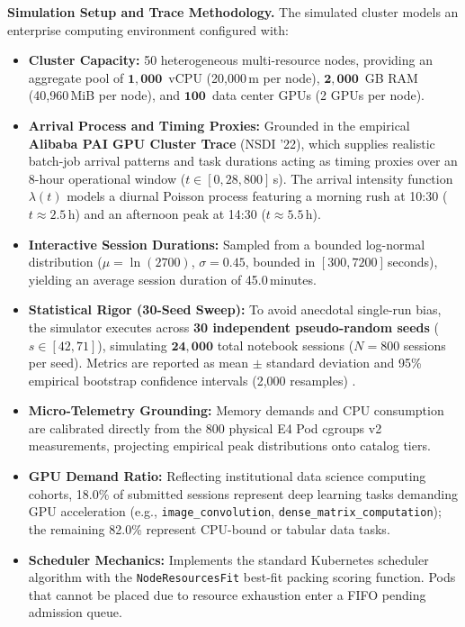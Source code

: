 \textbf{Simulation Setup and Trace Methodology.}
The simulated cluster models an enterprise computing environment configured with:
\begin{itemize}
    \item \textbf{Cluster Capacity:} 50 heterogeneous multi-resource nodes, providing an aggregate pool of $\mathbf{1,000}$~vCPU (20,000\,m per node), $\mathbf{2,000}$~GB RAM (40,960\,MiB per node), and $\mathbf{100}$~data center GPUs (2 GPUs per node).
    \item \textbf{Arrival Process and Timing Proxies:} Grounded in the empirical \textbf{Alibaba PAI GPU Cluster Trace} \cite{alibaba_gpu_trace} (NSDI '22), which supplies realistic batch-job arrival patterns and task durations acting as timing proxies over an 8-hour operational window ($t \in [0, 28,800]$\,s). The arrival intensity function $\lambda(t)$ models a diurnal Poisson process featuring a morning rush at 10:30 ($t \approx 2.5$\,h) and an afternoon peak at 14:30 ($t \approx 5.5$\,h).
    \item \textbf{Interactive Session Durations:} Sampled from a bounded log-normal distribution ($\mu = \ln(2700)$, $\sigma = 0.45$, bounded in $[300, 7200]$\,seconds), yielding an average session duration of 45.0\,minutes.
    \item \textbf{Statistical Rigor (30-Seed Sweep):} To avoid anecdotal single-run bias, the simulator executes across \textbf{30 independent pseudo-random seeds} ($s \in [42, 71]$), simulating $\mathbf{24,000}$ total notebook sessions ($N = 800$ sessions per seed). Metrics are reported as mean $\pm$ standard deviation and 95\% empirical bootstrap confidence intervals (2,000 resamples) \cite{bootstrap}.
    \item \textbf{Micro-Telemetry Grounding:} Memory demands and CPU consumption are calibrated directly from the 800 physical E4 Pod cgroups v2 measurements, projecting empirical peak distributions onto catalog tiers.
    \item \textbf{GPU Demand Ratio:} Reflecting institutional data science computing cohorts, 18.0\% of submitted sessions represent deep learning tasks demanding GPU acceleration (e.g., \texttt{image\_convolution}, \texttt{dense\_matrix\_computation}); the remaining 82.0\% represent CPU-bound or tabular data tasks.
    \item \textbf{Scheduler Mechanics:} Implements the standard Kubernetes scheduler algorithm with the \texttt{NodeResourcesFit} best-fit packing scoring function. Pods that cannot be placed due to resource exhaustion enter a FIFO pending admission queue.
\end{itemize}

